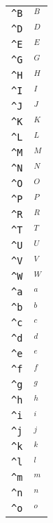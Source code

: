 \begin{longtable}{ll}
\texttt{\textasciicircum B}&${}^B{}$\\
\texttt{\textasciicircum D}&${}^D{}$\\
\texttt{\textasciicircum E}&${}^E{}$\\
\texttt{\textasciicircum G}&${}^G{}$\\
\texttt{\textasciicircum H}&${}^H{}$\\
\texttt{\textasciicircum I}&${}^I{}$\\
\texttt{\textasciicircum J}&${}^J{}$\\
\texttt{\textasciicircum K}&${}^K{}$\\
\texttt{\textasciicircum L}&${}^L{}$\\
\texttt{\textasciicircum M}&${}^M{}$\\
\texttt{\textasciicircum N}&${}^N{}$\\
\texttt{\textasciicircum O}&${}^O{}$\\
\texttt{\textasciicircum P}&${}^P{}$\\
\texttt{\textasciicircum R}&${}^R{}$\\
\texttt{\textasciicircum T}&${}^T{}$\\
\texttt{\textasciicircum U}&${}^U{}$\\
\texttt{\textasciicircum V}&${}^V{}$\\
\texttt{\textasciicircum W}&${}^W{}$\\
\texttt{\textasciicircum a}&${}^a{}$\\
\texttt{\textasciicircum b}&${}^b{}$\\
\texttt{\textasciicircum c}&${}^c{}$\\
\texttt{\textasciicircum d}&${}^d{}$\\
\texttt{\textasciicircum e}&${}^e{}$\\
\texttt{\textasciicircum f}&${}^f{}$\\
\texttt{\textasciicircum g}&${}^g{}$\\
\texttt{\textasciicircum h}&${}^h{}$\\
\texttt{\textasciicircum i}&${}^i{}$\\
\texttt{\textasciicircum j}&${}^j{}$\\
\texttt{\textasciicircum k}&${}^k{}$\\
\texttt{\textasciicircum l}&${}^l{}$\\
\texttt{\textasciicircum m}&${}^m{}$\\
\texttt{\textasciicircum n}&${}^n{}$\\
\texttt{\textasciicircum o}&${}^o{}$\\

\end{longtable}
